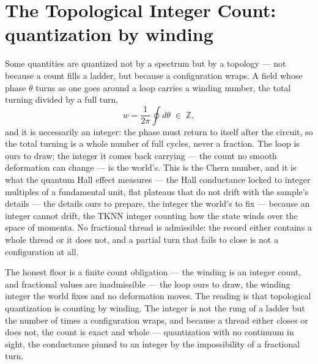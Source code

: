 \section{The Topological Integer Count: quantization by winding}
\label{se:topological}

Some quantities are quantized not by a spectrum but by a topology --- not because a count fills a ladder, but
because a configuration wraps. A field whose phase $\theta$ turns as one goes around a loop carries a winding
number, the total turning divided by a full turn,
\begin{equation}
  w = \frac{1}{2\pi}\oint d\theta \;\in\; \mathbb{Z},
\end{equation}
and it is necessarily an integer: the phase must return to itself after the circuit, so the total turning is a
whole number of full cycles, never a fraction. The loop is ours to draw; the integer it comes back carrying ---
the count no smooth deformation can change --- is the world's. This is the Chern number, and it is what the quantum Hall effect
measures --- the Hall conductance locked to integer multiples of a fundamental unit, flat plateaus that do not
drift with the sample's details --- the details ours to prepare, the integer the world's to fix --- because an
integer cannot drift, the TKNN integer counting how the state winds over the space of momenta. No fractional
thread is admissible: the record either contains a whole thread or it does not, and a partial turn that fails
to close is not a configuration at all.

The honest floor is a finite count obligation --- the winding is an integer count, and fractional values are
inadmissible --- the loop ours to draw, the winding integer the world fixes and no deformation moves. The
reading is that topological quantization is counting by winding. The integer is not the rung
of a ladder but the number of times a configuration wraps, and because a thread either closes or does not, the
count is exact and whole --- quantization with no continuum in sight, the conductance pinned to an integer by
the impossibility of a fractional turn.

\bigskip

